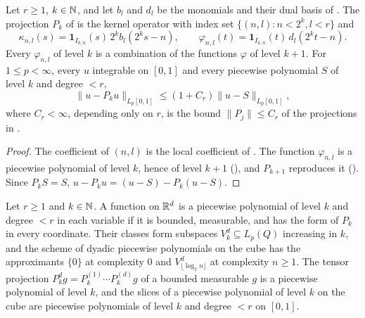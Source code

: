 \begin{lemma}
\label{lem:pp-kernel}
\leanok
{}
Let $r \geq 1$, $k \in \mathbb{N}$, and let $b_l$ and $d_l$ be the monomials and their dual basis of
. The projection $P_k$ of  is the kernel operator with
index set $\{(n, l) : n < 2^k, l < r\}$ and
\[
  \kappa_{n,l}(s) = \mathbf{1}_{I_{k,n}}(s) \, 2^k b_l(2^k s - n) ,
  \qquad
  \varphi_{n,l}(t) = \mathbf{1}_{I_{k,n}}(t) \, d_l(2^k t - n) .
\]
Every $\varphi_{n,l}$ of level $k$ is a combination of the functions $\varphi$ of level $k + 1$.
For $1 \leq p < \infty$, every $u$ integrable on $[0, 1]$ and every piecewise polynomial $S$ of
level $k$ and degree $< r$,
\[
  \|u - P_k u\|_{L_p[0,1]} \leq (1 + C_r) \|u - S\|_{L_p[0,1]} ,
\]
where $C_r < \infty$, depending only on $r$, is the bound $\|P_j\| \leq C_r$ of the projections
in .
\end{lemma}

\begin{proof}
\leanok
The coefficient of $(n, l)$ is the local coefficient of . The function
$\varphi_{n,l}$ is a piecewise polynomial of level $k$, hence of level $k + 1$
(), and $P_{k+1}$ reproduces it (). Since $P_k S = S$,
$u - P_k u = (u - S) - P_k (u - S)$.
\end{proof}

\begin{definition}
\label{def:cube-pp}
\leanok
{}
Let $r \geq 1$ and $k \in \mathbb{N}$. A function on $\mathbb{R}^d$ is a piecewise polynomial of level $k$ and
degree $< r$ in each variable if it is bounded, measurable, and has the form of $P_k$ in every
coordinate. Their classes form subspaces $V^d_k \subseteq L_p(Q)$ increasing in $k$, and the
scheme of dyadic piecewise polynomials on the cube has the approximants $\{0\}$ at complexity $0$
and $V^d_{\lfloor \log_2 n \rfloor}$ at complexity $n \geq 1$. The tensor projection
$P^d_k g = P_k^{(1)} \cdots P_k^{(d)} g$ of a bounded measurable $g$ is a piecewise polynomial of
level $k$, and the slices of a piecewise polynomial of level $k$ on the cube are piecewise
polynomials of level $k$ and degree $< r$ on $[0, 1]$.
\end{definition}


